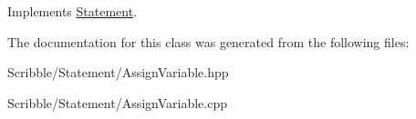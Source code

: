 Implements \hyperlink{class_statement}{Statement}.



The documentation for this class was generated from the following files\-:\begin{DoxyCompactItemize}
\item 
Scribble/\-Statement/Assign\-Variable.\-hpp\item 
Scribble/\-Statement/Assign\-Variable.\-cpp\end{DoxyCompactItemize}
